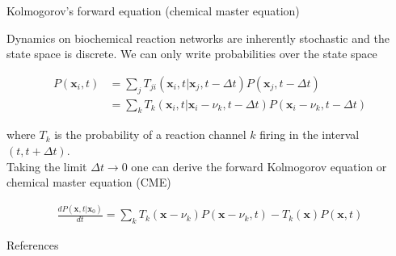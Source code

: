\documentclass[aspectratio=1610]{beamer}					%
\begin{document}
\begin{frame}{Kolmogorov's forward equation (chemical master equation)}

Dynamics on biochemical reaction networks are inherently stochastic and the state space is discrete. We can only write probabilities over the state space

\vspace{0.1in}

\begin{align*}
P(\mathbf{x}_{i},t) &= \sum_{j} T_{ji}(\mathbf{x}_{i},t|\mathbf{x}_{j},t-\Delta t)P(\mathbf{x}_{j},t-\Delta t)\\ 
&= \sum_{k} T_{k}(\mathbf{x}_{i},t|\mathbf{x}_{i}-\nu_{k},t-\Delta t)P(\mathbf{x}_{i}-\nu_{k},t-\Delta t)
\end{align*}

where $T_{k}$ is the probability of a reaction channel $k$ firing in the interval $(t,t+\Delta t)$.\\
\vspace{0.1in}
Taking the limit $\Delta t \rightarrow 0$ one can derive the forward Kolmogorov equation or chemical master equation (CME)

\begin{align*}
\frac{dP(\mathbf{x},t|\mathbf{x}_{0})}{dt} = \sum_{k} T_{k}(\mathbf{x}-\nu_{k})P(\mathbf{x}-\nu_{k},t) - T_{k}(\mathbf{x})P(\mathbf{x},t)
\end{align*}

\end{frame}


\begin{frame}[allowframebreaks]{References}
	\tiny
	
\end{frame}
\end{document}

